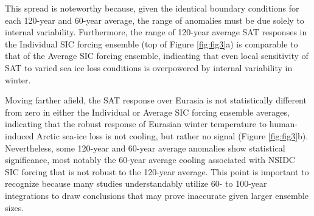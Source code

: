 \documentclass{nature}
\begin{document}
This spread is noteworthy because, given the identical boundary conditions for each 120-year and 60-year average, the range of anomalies must be due solely to internal variability. Furthermore, the range of 120-year average SAT responses in the Individual SIC forcing ensemble (top of Figure \ref{fig:fig3}a) is comparable to that of the Average SIC forcing ensemble, indicating that even local sensitivity of SAT to varied sea ice loss conditions is overpowered by internal variability in winter.    %


Moving farther afield, the SAT response over Eurasia is not statistically different from zero in either the Individual or Average SIC forcing ensemble averages, indicating that the robust response of Eurasian winter temperature to human-induced Arctic sea-ice loss is not cooling, but rather no signal (Figure \ref{fig:fig3}b). Nevertheless, some 120-year and 60-year average anomalies show statistical significance, most notably the 60-year average cooling associated with NSIDC SIC forcing that is not robust to the 120-year average. This point is important to recognize because many studies understandably utilize 60- to 100-year integrations to draw conclusions that may prove inaccurate given larger ensemble sizes.
\end{document}
